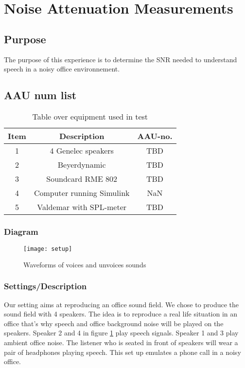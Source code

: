 \section{Noise Attenuation Measurements}

\subsection{Purpose}

The purpose of this experience is to determine the SNR needed to understand speech in a noisy office environnement.  

\subsection{AAU num list}

\begin{table}[h]
	\centering
	
	\begin{tabular}{ c c c } \toprule
		{Item} & {Description} & {AAU-no}. \\ \bottomrule 
		1      	&  4 Genelec speakers					& TBD		\\
		2      	&  Beyerdynamic 						& TBD		\\
		3      	&  Soundcard RME 802                   	& TBD		\\
		4      	&  Computer	running Simulink			& NaN		\\  
		5		&  Valdemar with SPL-meter				& TBD		\\ \bottomrule 
	\end{tabular}
	\caption{Table over equipment used in test}
	\label{tab:UsedEquipmentListning1}
\end{table}



\subsubsection{Diagram}

\begin{figure}[H]
	\centering
	\texttt{[image: setup]}
	\caption{Waveforms of voices and unvoices sounds}
	\label{fig1}
\end{figure}


\subsubsection{Settings/Description}

Our setting aims at reproducing an office sound field. We chose to produce the sound field with 4 speakers. 
The idea is to reproduce a real life situation in an office that's why speech and office background noise will be played on the speakers. Speaker 2 and 4 in figure \ref{fig1} play speech signals. Speaker 1 and 3 play ambient office noise. 
The listener who is seated in front of speakers will wear a pair of headphones playing speech. This set up emulates a phone call in a noisy office.

